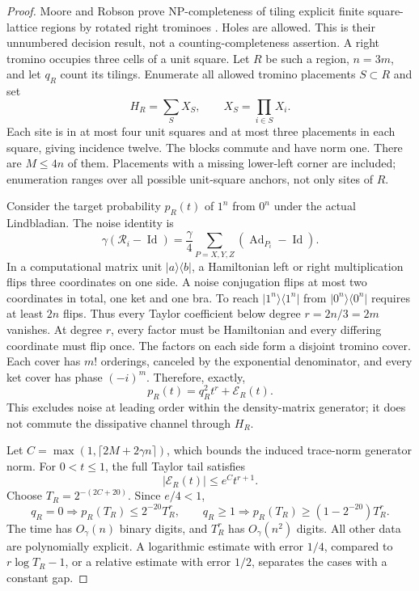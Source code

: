 \documentclass[11pt,reqno]{amsart}
\numberwithin{equation}{section}
\theoremstyle{definition}
\theoremstyle{remark}
\newcommand{\Id}{\operatorname{Id}}
\newcommand{\ket}[1]{\lvert#1\rangle}
\newcommand{\bra}[1]{\langle#1\rvert}
\newcommand{\reset}{\mathcal R}
\begin{document}
\begin{proof}
Moore and Robson prove NP-completeness of tiling explicit finite square-lattice regions by rotated right trominoes \cite[Sections~3 and~3.1]{MR}. Holes are allowed. This is their unnumbered decision result, not a counting-completeness assertion. A right tromino occupies three cells of a unit square. Let $R$ be such a region, $n=3m$, and let $q_R$ count its tilings. Enumerate all allowed tromino placements $S\subset R$ and set
\begin{equation}\label{eq:tilingH}
 H_R=\sum_S X_S,\qquad X_S=\prod_{i\in S}X_i.
\end{equation}
Each site is in at most four unit squares and at most three placements in each square, giving incidence twelve. The blocks commute and have norm one. There are $M\leq4n$ of them. Placements with a missing lower-left corner are included; enumeration ranges over all possible unit-square anchors, not only sites of $R$.

Consider the target probability $p_R(t)$ of $1^n$ from $0^n$ under the actual Lindbladian. The noise identity is
\[
 \gamma(\reset_i-\Id)=\frac\gamma4\sum_{P=X,Y,Z}(\operatorname{Ad}_{P_i}-\Id).
\]
In a computational matrix unit $\ket a\bra b$, a Hamiltonian left or right multiplication flips three coordinates on one side. A noise conjugation flips at most two coordinates in total, one ket and one bra. To reach $\ket{1^n}\bra{1^n}$ from $\ket{0^n}\bra{0^n}$ requires at least $2n$ flips. Thus every Taylor coefficient below degree $r=2n/3=2m$ vanishes. At degree $r$, every factor must be Hamiltonian and every differing coordinate must flip once. The factors on each side form a disjoint tromino cover. Each cover has $m!$ orderings, canceled by the exponential denominator, and every ket cover has phase $(-i)^m$. Therefore, exactly,
\begin{equation}\label{eq:leading}
 p_R(t)=q_R^2t^r+\mathcal E_R(t).
\end{equation}
This excludes noise at leading order within the density-matrix generator; it does not commute the dissipative channel through $H_R$.

Let $C=\max(1,\lceil2M+2\gamma n\rceil)$, which bounds the induced trace-norm generator norm. For $0<t\leq1$, the full Taylor tail satisfies
\[
 |\mathcal E_R(t)|\leq e^C t^{r+1}.
\]
Choose $T_R=2^{-(2C+20)}$. Since $e/4<1$,
\begin{equation}\label{eq:separation}
 q_R=0\Longrightarrow p_R(T_R)\leq2^{-20}T_R^r,
 \qquad
 q_R\geq1\Longrightarrow p_R(T_R)\geq(1-2^{-20})T_R^r.
\end{equation}
The time has $O_\gamma(n)$ binary digits, and $T_R^r$ has $O_\gamma(n^2)$ digits. All other data are polynomially explicit. A logarithmic estimate with error $1/4$, compared to $r\log T_R-1$, or a relative estimate with error $1/2$, separates the cases with a constant gap.


\end{proof}
\end{document}
